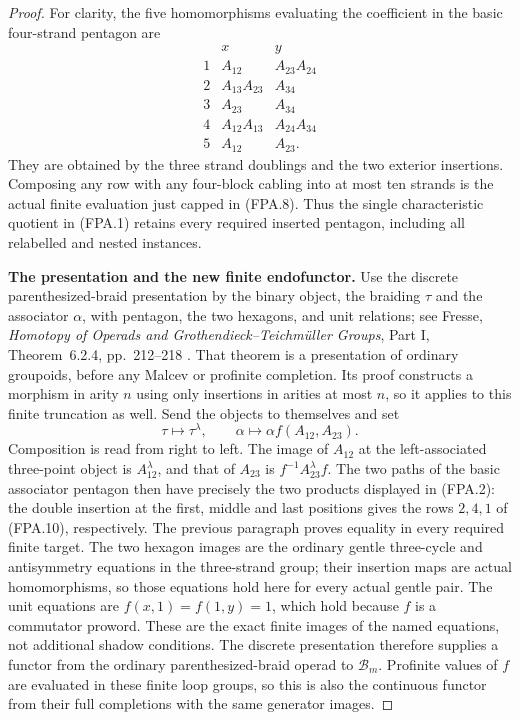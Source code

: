\begin{proof}
For clarity, the five homomorphisms evaluating the
coefficient in the basic four-strand pentagon are
\[
\begin{array}{c|cc}
 &x&y\\ \hline
 1&A_{12}&A_{23}A_{24}\\
 2&A_{13}A_{23}&A_{34}\\
 3&A_{23}&A_{34}\\
 4&A_{12}A_{13}&A_{24}A_{34}\\
 5&A_{12}&A_{23}.
\end{array}                                                    \tag{FPA.10}
\]
They are obtained by the three strand doublings and
the two exterior insertions.  Composing any row with
any four-block cabling into at most ten strands is the
actual finite evaluation just capped in (FPA.8).
Thus the single characteristic quotient in (FPA.1)
retains every required inserted pentagon, including
all relabelled and nested instances.

\par\medskip\noindent\textbf{The presentation and the new finite endofunctor.}\quad
Use the discrete parenthesized-braid presentation by the
binary object, the braiding $\tau$ and the associator
$\alpha$, with pentagon, the two hexagons, and unit
relations; see Fresse, \emph{Homotopy of Operads and
Grothendieck--Teichm\"uller Groups}, Part I, Theorem~6.2.4,
pp.~212--218 \cite{Fresse2017}.  That theorem is a presentation of ordinary
groupoids, before any Malcev or profinite completion.
Its proof constructs a morphism in arity $n$ using only
insertions in arities at most $n$, so it applies to this
finite truncation as well.
Send the objects to themselves and set
\[
       \tau\longmapsto\tau^\lambda,\qquad
       \alpha\longmapsto\alpha f(A_{12},A_{23}).        \tag{FPA.11}
\]
Composition is read from right to left.  The image of
$A_{12}$ at the left-associated three-point object is
$A_{12}^\lambda$, and that of $A_{23}$ is
$f^{-1}A_{23}^\lambda f$.
The two paths of the basic associator pentagon then
have precisely the two products displayed in (FPA.2):
the double insertion at the first, middle and last
positions gives the rows $2,4,1$ of (FPA.10), respectively.
The previous paragraph proves equality in every required
finite target.
The two hexagon images are the ordinary gentle
three-cycle and antisymmetry equations in the three-strand
group; their insertion maps are actual homomorphisms,
so those equations hold here for every actual gentle
pair.  The unit equations are $f(x,1)=f(1,y)=1$, which
hold because $f$ is a commutator proword.
These are the exact finite images of the named equations,
not additional shadow conditions.  The discrete
presentation therefore supplies a functor from the
ordinary parenthesized-braid operad to $\mathcal B_m$.
Profinite values of $f$ are evaluated in these finite
loop groups, so this is also the continuous functor
from their full completions with the same generator
images.


\end{proof}

